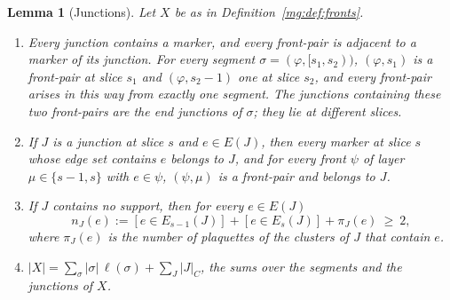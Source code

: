 \documentclass[11pt,a4paper]{article}
\newtheorem{lemma}[theorem]{Lemma}
\theoremstyle{definition}
\theoremstyle{remark}
\begin{document}
\begin{lemma}[Junctions]\label{mg:lem:junction}
Let $X$ be as in Definition~\ref{mg:def:fronts}.
\begin{enumerate}[label=(\roman*)]
\item Every junction contains a marker, and every front-pair is adjacent to a marker of its junction. For every segment $\sigma=(\varphi,[s_1,s_2))$,
$(\varphi,s_1)$ is a front-pair at slice $s_1$ and $(\varphi,s_2-1)$ one at slice $s_2$, and every front-pair arises in this way from exactly one
segment. The junctions containing these two front-pairs are the \emph{end junctions} of $\sigma$; they lie at different slices.
\item If $J$ is a junction at slice $s$ and $e\in E(J)$, then every marker at slice $s$ whose edge set contains $e$ belongs to $J$, and for every
front $\psi$ of layer $\mu\in\{s-1,s\}$ with $e\in\psi$, $(\psi,\mu)$ is a front-pair and belongs to $J$.
\item If $J$ contains no support, then for every $e\in E(J)$
\[
n_J(e):=[e\in E_{s-1}(J)]+[e\in E_s(J)]+\pi_J(e)\ \ge\ 2,
\]
where $\pi_J(e)$ is the number of plaquettes of the clusters of $J$ that contain $e$.
\item $|X|=\sum_\sigma|\sigma|\,\ell(\sigma)+\sum_J|J|_C$, the sums over the segments and the junctions of $X$.
\end{enumerate}
\end{lemma}
\end{document}
